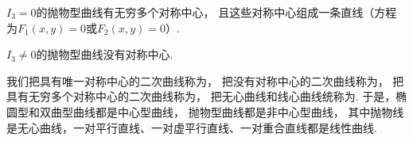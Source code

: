 \begin{theorem}
\(I_3 = 0\)的抛物型曲线有无穷多个对称中心，
且这些对称中心组成一条直线（方程为\(F_1(x,y) = 0\)或\(F_2(x,y) = 0\)）.
\end{theorem}

\begin{theorem}
\(I_3 \neq 0\)的抛物型曲线没有对称中心.
\end{theorem}

我们把具有唯一对称中心的二次曲线称为，
把没有对称中心的二次曲线称为，
把具有无穷多个对称中心的二次曲线称为，
把无心曲线和线心曲线统称为.
于是，椭圆型和双曲型曲线都是中心型曲线，
抛物型曲线都是非中心型曲线，
其中抛物线是无心曲线，一对平行直线、一对虚平行直线、一对重合直线都是线性曲线.
